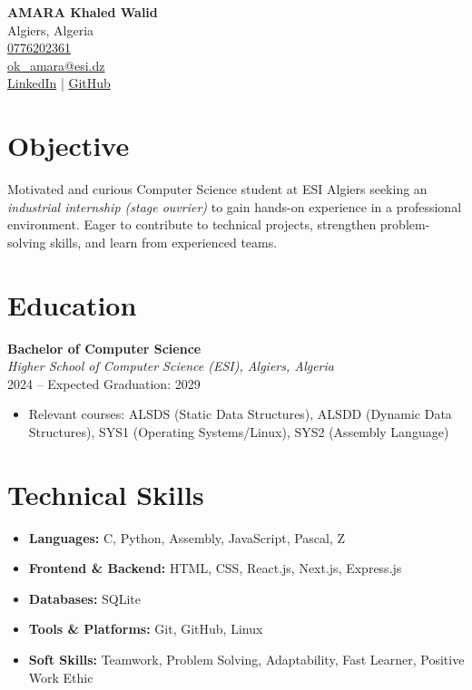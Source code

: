 \documentclass[a4paper,10pt]{article}
\begin{document}
\pagestyle{empty} %

\begin{center}
    \textbf{\Large AMARA Khaled Walid} \\
    Algiers, Algeria \\
    \href{tel:0776202361}{0776202361} \\
    \href{mailto:ok\_amara@esi.dz}{ok\_amara@esi.dz} \\
    \href{https://www.linkedin.com/in/amara-khaled-walid-782b9833b}{LinkedIn} \quad | \quad \href{https://github.com/AMARA-Khaled}{GitHub}
\end{center}

\section*{Objective}
Motivated and curious Computer Science student at ESI Algiers seeking an \textit{industrial internship (stage ouvrier)} to gain hands-on experience in a professional environment. Eager to contribute to technical projects, strengthen problem-solving skills, and learn from experienced teams.

\section*{Education}
\textbf{Bachelor of Computer Science} \\
\textit{Higher School of Computer Science (ESI), Algiers, Algeria} \\
2024 -- Expected Graduation: 2029
\begin{itemize}[left=0pt, label={}]
    \item Relevant courses: ALSDS (Static Data Structures), ALSDD (Dynamic Data Structures), SYS1 (Operating Systems/Linux), SYS2 (Assembly Language)
\end{itemize}

\section*{Technical Skills}
\begin{itemize}
    \item \textbf{Languages:} C, Python, Assembly, JavaScript, Pascal, Z
    \item \textbf{Frontend \& Backend:} HTML, CSS, React.js, Next.js, Express.js
    \item \textbf{Databases:} SQLite
    \item \textbf{Tools \& Platforms:} Git, GitHub, Linux
    \item \textbf{Soft Skills:} Teamwork, Problem Solving, Adaptability, Fast Learner, Positive Work Ethic
\end{itemize}
\end{document}
